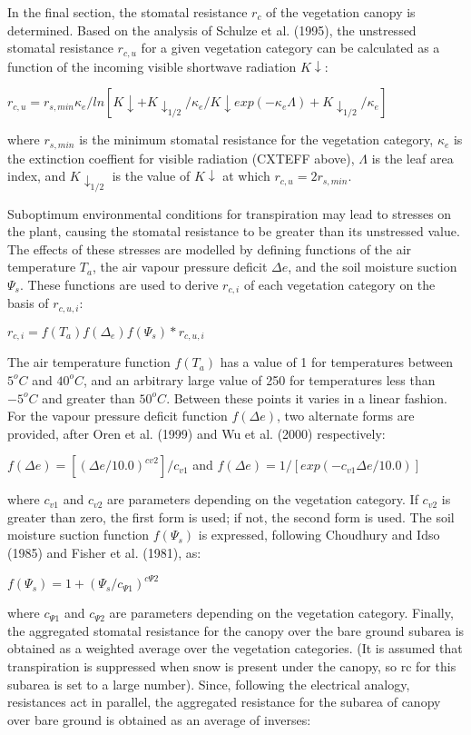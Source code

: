 In the final section, the stomatal resistance $r_c$ of the vegetation canopy is determined. Based on the analysis of Schulze et al. (1995), the unstressed stomatal resistance $r_{c,u}$ for a given vegetation category can be calculated as a function of the incoming visible shortwave radiation $K\downarrow$\+:

$r_{c,u} = r_{s,min} \kappa_e / ln[{K\downarrow + K\downarrow_{1/2} / \kappa_e} / { K\downarrow exp(-\kappa_e \Lambda ) + K\downarrow_{1/2} / \kappa_e }]$

where $r_{s,min}$ is the minimum stomatal resistance for the vegetation category, $\kappa_e$ is the extinction coeffient for visible radiation (C\+X\+T\+E\+F\+F above), $\Lambda$ is the leaf area index, and $K\downarrow_{1/2}$ is the value of $K\downarrow$ at which $r_{c,u} = 2 r_{s,min}.$

Suboptimum environmental conditions for transpiration may lead to stresses on the plant, causing the stomatal resistance to be greater than its unstressed value. The effects of these stresses are modelled by defining functions of the air temperature $T_a$, the air vapour pressure deficit $\Delta e$, and the soil moisture suction $\Psi_s$. These functions are used to derive $r_{c,i}$ of each vegetation category on the basis of $r_{c,u,i}$\+:

$r_{c,i} = f(T_a) f( \Delta_e ) f( \Psi_s ) * r_{c,u,i}$

The air temperature function $f(T_a)$ has a value of 1 for temperatures between $5^o C$ and $40^o C$, and an arbitrary large value of 250 for temperatures less than $-5^o C$ and greater than $50^o C$. Between these points it varies in a linear fashion. For the vapour pressure deficit function $f( \Delta e )$, two alternate forms are provided, after Oren et al. (1999) and Wu et al. (2000) respectively\+:

$f( \Delta e) = [( \Delta e/10.0)^{cv2}]/c_{v1}$ and $f(\Delta e) = 1/[exp(-c_{v1} \Delta e/10.0)]$

where $c_{v1}$ and $c_{v2}$ are parameters depending on the vegetation category. If $c_{v2}$ is greater than zero, the first form is used; if not, the second form is used. The soil moisture suction function $f(\Psi_s)$ is expressed, following Choudhury and Idso (1985) and Fisher et al. (1981), as\+:

$f(\Psi_s) = 1 + (\Psi_s / c_{\Psi 1})^{c \Psi 2}$

where $c_{\Psi 1}$ and $c_{\Psi 2}$ are parameters depending on the vegetation category. Finally, the aggregated stomatal resistance for the canopy over the bare ground subarea is obtained as a weighted average over the vegetation categories. (It is assumed that transpiration is suppressed when snow is present under the canopy, so rc for this subarea is set to a large number). Since, following the electrical analogy, resistances act in parallel, the aggregated resistance for the subarea of canopy over bare ground is obtained as an average of inverses\+:

